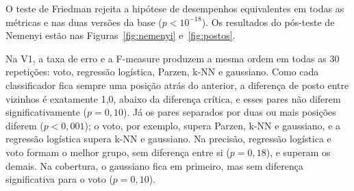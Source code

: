 \documentclass[12pt,reqno]{amsart}
\begin{document}
\begin{table}[H]
\centering
\caption{Teste de Friedman e postos médios (1 = melhor).}
\label{tab:friedman}
\end{table}

O teste de Friedman rejeita a hipótese de desempenhos equivalentes em todas as métricas e nas
duas versões da base ($p<10^{-18}$). Os resultados do pós-teste de Nemenyi estão nas
Figuras~\ref{fig:nemenyi} e~\ref{fig:postos}.

Na V1, a taxa de erro e a F-measure produzem a mesma ordem em todas as 30 repetições: voto,
regressão logística, Parzen, k-NN e gaussiano. Como cada classificador fica sempre uma posição
atrás do anterior, a diferença de posto entre vizinhos é exatamente 1,0, abaixo da diferença
crítica, e esses pares não diferem significativamente ($p=0{,}10$). Já os pares separados por
duas ou mais posições diferem ($p<0{,}001$); o voto, por exemplo, supera Parzen, k-NN e
gaussiano, e a regressão logística supera k-NN e gaussiano. Na precisão, regressão logística e
voto formam o melhor grupo, sem diferença entre si ($p=0{,}18$), e superam os demais. Na
cobertura, o gaussiano fica em primeiro, mas sem diferença significativa para o voto
($p=0{,}10$).
\end{document}
